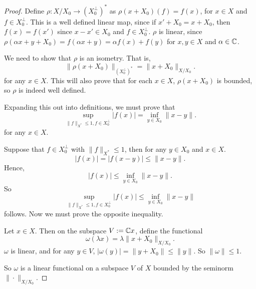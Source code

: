 \documentclass{unswmaths}
\begin{document}
\begin{proof}
    Define $\rho:X/X_0\rightarrow (X_0^\perp)^*$ as $\rho(x+X_0)(f) = f(x)$, for $x \in X$
    and $f \in X_0^\perp$. This is a well defined linear map, since if $x' + X_0 = x+X_0$, then 
    $f(x) = f(x')$ since $x-x' \in X_0$ and $f \in X_0^\perp$. $\rho$ is linear, since $\rho(\alpha x+y+X_0) = f(\alpha x+y) = \alpha f(x) + f(y)$
    for $x,y \in X$ and $\alpha \in \mathbb{C}$.
        
    
    We need to show that $\rho$ is an isometry. That is,
    \begin{equation*}
        \| \rho(x+X_0)\|_{(X_0^\perp)^*} = \| x+X_0\|_{X/X_0}.
    \end{equation*}
    for any $x \in X$. This will also prove that for each $x\in X$, $\rho(x+X_0)$
    is bounded, so $\rho$ is indeed well defined.
    
    Expanding this out into definitions, we must prove that
    \begin{equation}
    \label{isometryCondition}
        \sup_{\|f\|_{X^*} \leq 1, f \in X_0^\perp} |f(x)| = \inf_{y \in X_0} \|x-y\|.
    \end{equation}
    for any $x \in X$.
    
    Suppose that $f \in X_0^\perp$ with $\|f\|_{X^*} \leq 1$, then for any $y \in X_0$
    and $x \in X$.
    \begin{equation*}
        |f(x)| = |f(x-y)| \leq \|x-y\|.
    \end{equation*}
    Hence,
    \begin{equation*}
        |f(x)| \leq \inf_{y \in X_0} \|x-y\|.
    \end{equation*}
    So
    \begin{equation*}
        \sup_{\|f\|_{X^*} \leq 1, f \in X_0^\perp} |f(x)| \leq \inf_{y \in X_0} \|x-y\|
    \end{equation*}
    follows. Now we must prove the opposite inequality. 
    
    Let $x \in X$. Then on the subspace $V := \mathbb{C} x$, define the functional
    \begin{equation*}
        \omega(\lambda x) = \lambda \|x+X_0\|_{X/X_0}.
    \end{equation*}
    $\omega$ is linear, and for any $y \in V$, $|\omega(y)| = \|y+X_0\| \leq \|y\|$.  So $\|\omega\| \leq 1$.
    
    So $\omega$ is a linear functional on a subspace $V$ of $X$ bounded by the seminorm $\|\cdot\|_{X/X_0}$. 
    

\end{proof}
\end{document}
